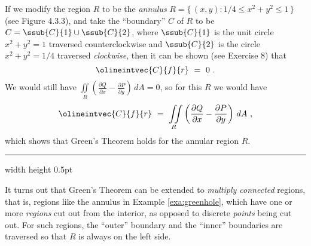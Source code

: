 If we modify the region $R$ to be the \emph{annulus} $R =\lbrace\,(x,y): 1/4 \le x^2 + y^2 \le 1\,\rbrace$ (see
Figure 4.3.3), and take the ``boundary'' $C$ of $R$ to be $C = \ssub{C}{1} \cup \ssub{C}{2}$,
where $\ssub{C}{1}$ is
the unit circle $x^2 + y^2 = 1$ traversed counterclockwise and $\ssub{C}{2}$ is the circle $x^2 + y^2 = 1/4$
traversed \emph{clockwise}, then it can be shown (see Exercise 8) that
\begin{displaymath}
 \olineintvec{C}{f}{r} ~=~ 0 ~.
\end{displaymath}
We would still have $\iint\limits_{R} \left( \frac{\partial Q}{\partial x} - \frac{\partial P}{\partial y} \right)\,dA
= 0$, so for this $R$ we would have
\begin{displaymath}
 \olineintvec{C}{f}{r} ~=~
 \iint\limits_{R} \left( \frac{\partial Q}{\partial x} - \frac{\partial P}{\partial y} \right)\,dA ~,
\end{displaymath}
which shows that Green's Theorem holds for the annular region $R$.\vspace{3mm}
\hrule width \textwidth height 0.5pt
\vspace{3mm}

It turns out that Green's Theorem can be extended to \emph{multiply connected} regions, that is, regions like
the annulus in Example \ref{exa:greenhole}, which have one or more \emph{regions} cut out from the interior, as
opposed to discrete \emph{points} being cut out. For such
regions, the ``outer'' boundary and the ``inner'' boundaries are traversed so that $R$ is always on the left
side.\vspace{-1mm}

